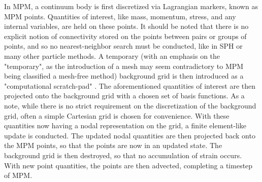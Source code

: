 In MPM, a continuum body is first discretized via Lagrangian markers, known as MPM points. Quantities of interest, like mass, momentum, stress, and any internal variables, are held on these points. It should be noted that there is no explicit notion of connectivity stored on the points between pairs or groups of points, and so no nearest-neighbor search must be conducted, like in SPH or many other particle methods. A temporary (with an emphasis on the "temporary", as the introduction of a mesh may seem contradictory to MPM being classified a mesh-free method) background grid is then introduced as a "computational scratch-pad" . The aforementioned quantities of interest are then projected onto the background grid with a chosen set of basis functions. As a note, while there is no strict requirement on the discretization of the background grid, often a simple Cartesian grid is chosen for convenience. With these quantities now having a nodal representation on the grid, a finite element-like update is conducted. The updated nodal quantities are then projected back onto the MPM points, so that the points are now in an updated state. The background grid is then destroyed, so that no accumulation of strain occurs. With new point quantities, the points are then advected, completing a timestep of MPM.

